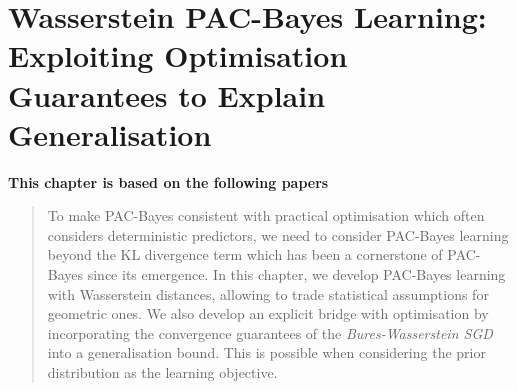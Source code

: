 \chapter[Wasserstein PAC-Bayes Learning: Exploiting Optimisation Guarantees to Explain Generalisation]{Wasserstein PAC-Bayes Learning: Exploiting Optimisation Guarantees to Explain Generalisation}
\label{chap: wass-pb}
\addchapterlof
\addchapterloa
\addchapterloe

\vspace{-1.6cm}
\begin{center}
\textbf{This chapter is based on the following papers}\\
\end{center}
\vspace{-0.3cm}

\vspace{-0.3cm}
\minitoc

\vspace{-0.2cm}

\begin{abstract}
    To make PAC-Bayes consistent with practical optimisation which often considers deterministic predictors, we need to consider PAC-Bayes learning beyond the KL divergence term which has been a cornerstone of PAC-Bayes since its emergence. In this chapter, we develop PAC-Bayes learning with Wasserstein distances, allowing to trade statistical assumptions for geometric ones. We also develop an explicit bridge with optimisation by incorporating the convergence guarantees of the \emph{Bures-Wasserstein SGD} into a generalisation bound. This is possible when considering the prior distribution as the learning objective.    
\end{abstract}

\newpage


